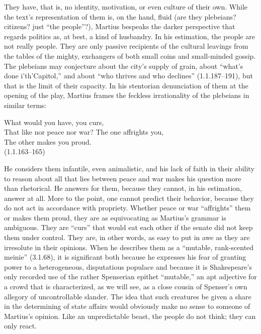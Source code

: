 They have, that is, no identity, motivation, or even culture of their own.
While the text's representation of them is, on the hand, fluid (are they plebeians? citizens? just ``the people''?), Martius bespeaks the darker perspective that regards politics as, at best, a kind of husbandry.
In his estimation, the people are not really people.
They are only passive recipients of the cultural leavings from the tables of the mighty, exchangers of both small coins and small-minded gossip.
The plebeians may conjecture about the city's supply of grain, about ``what's done i'th'Capitol,'' and about ``who thrives and who declines'' (1.1.187--191), but that is the limit of their capacity.
In his stentorian denunciation of them at the opening of the play, Martius frames the feckless irrationality of the plebeians in similar terms:
\begin{vq}
What would you have, you curs,\\
That like nor peace nor war? The one affrights you,\\
The other makes you proud.\\
\hfill(1.1.163--165)
\end{vq}
He considers them infantile, even animalistic, and his lack of faith in their ability to reason about all that lies between peace and war makes his question more than rhetorical.
He answers for them, because they cannot, in his estimation, answer at all.
More to the point, one cannot predict their behavior, because they do not act in accordance with propriety.
Whether peace or war ``affrights'' them or makes them proud, they are as equivocating as Martius's grammar is ambiguous.
They are ``curs'' that would eat each other if the senate did not keep them under control.
They are, in other words, as easy to put in awe as they are irresolute in their opinions.
When he describes them as a ``mutable, rank-scented meinie'' (3.1.68), it is significant both because he expresses his fear of granting power to a heterogeneous, disputatious populace and because it is Shakespeare's only recorded use of the rather Spenserian epithet ``mutable,'' an apt adjective for a crowd that is characterized, as we will see, as a close cousin of Spenser's own allegory of uncontrollable slander.
The idea that such creatures be given a share in the determining of state affairs would obviously make no sense to someone of Martius's opinion.
Like an unpredictable beast, the people do not think; they can only react.

